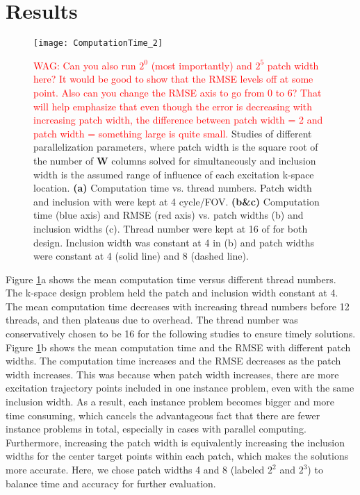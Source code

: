 \section*{Results}

\begin{figure}
	\centering
	\texttt{[image: ComputationTime\_2]}
	\caption{\textcolor{red}{WAG: Can you also run $2^0$ (most importantly) and $2^5$ patch width here? It would be good to show that the RMSE levels off at some point. Also can you change the RMSE axis to go from 0 to 6? That will help emphasize that even though the error is decreasing with increasing patch width, 
	the difference between patch width = 2 and patch width = something large is quite small. }
	Studies of different parallelization parameters, where patch width is the square root of the number of $\mathbf{W}$ columns solved for simultaneously and inclusion width is the assumed range of influence of each excitation k-space location. \textbf{(a)} Computation time vs. thread numbers. Patch width and inclusion with were kept at 4 cycle/FOV. \textbf{(b\&c)} Computation time (blue axis) and RMSE (red axis) vs. patch widths (b) and inclusion widths (c). Thread number were kept at 16 of for both design. Inclusion width was constant at 4 in (b) and patch widths were constant at 4 (solid line) and 8 (dashed line).}
	\label{fig:ComputationTime}
\end{figure}
Figure \ref{fig:ComputationTime}a shows the mean computation time versus different thread numbers. The k-space design problem held the patch and inclusion width constant at 4. The mean computation time decreases with increasing thread numbers before 12 threads, and then plateaus due to overhead. The thread number was conservatively chosen to be 16 for the following studies to ensure timely solutions. 
Figure \ref{fig:ComputationTime}b shows the mean computation time and the RMSE with different patch widths. The computation time increases and the RMSE decreases as the patch width increases. This was because when patch width increases, there are more excitation trajectory points included in one instance problem, even with the same inclusion width. As a result, each instance problem becomes bigger and more time consuming, which cancels the advantageous fact that there are fewer instance problems in total, especially in cases with parallel computing. Furthermore, increasing the patch width is equivalently increasing the inclusion widths for the center target points within each patch, which makes the solutions more accurate. Here, we chose patch widths 4 and 8 (labeled $2^2$ and $2^3$) to balance time and accuracy for further evaluation.
